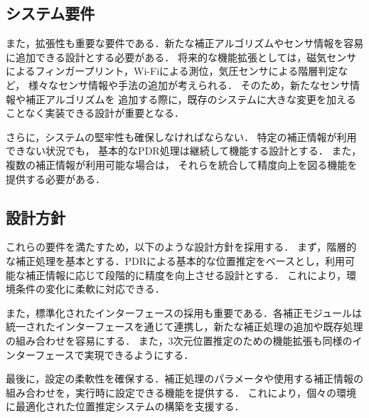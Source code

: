 \subsection{システム要件}

また，拡張性も重要な要件である．新たな補正アルゴリズムやセンサ情報を容易に追加できる設計とする必要がある．
将来的な機能拡張としては，磁気センサによるフィンガープリント，Wi-Fiによる測位，気圧センサによる階層判定など，
様々なセンサ情報や手法の追加が考えられる．
そのため，新たなセンサ情報や補正アルゴリズムを
追加する際に，既存のシステムに大きな変更を加えることなく実装できる設計が重要となる．

さらに，システムの堅牢性も確保しなければならない．
特定の補正情報が利用できない状況でも，
基本的なPDR処理は継続して機能する設計とする．
また，複数の補正情報が利用可能な場合は，
それらを統合して精度向上を図る機能を提供する必要がある．

\subsection{設計方針}

これらの要件を満たすため，以下のような設計方針を採用する．
まず，階層的な補正処理を基本とする．PDRによる基本的な位置推定をベースとし，利用可能な補正情報に応じて段階的に精度を向上させる設計とする．
これにより，環境条件の変化に柔軟に対応できる．

また，標準化されたインターフェースの採用も重要である．各補正モジュールは統一されたインターフェースを通じて連携し，新たな補正処理の追加や既存処理の組み合わせを容易にする．
また，3次元位置推定のための機能拡張も同様のインターフェースで実現できるようにする．

最後に，設定の柔軟性を確保する．補正処理のパラメータや使用する補正情報の組み合わせを，実行時に設定できる機能を提供する．
これにより，個々の環境に最適化された位置推定システムの構築を支援する．


